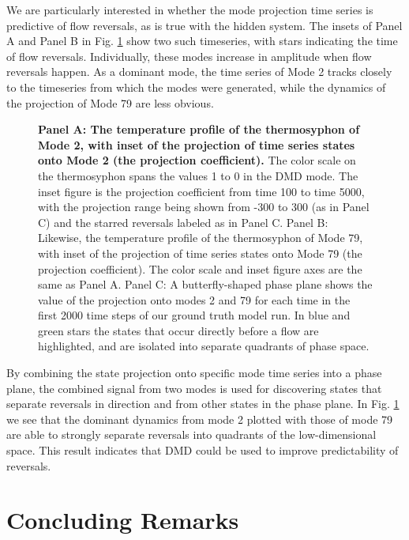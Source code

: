 \documentclass[10pt,letterpaper]{article}
\begin{document}
We are particularly interested in whether the mode projection time series is predictive of flow reversals, as is true with the hidden system.
The insets of Panel A and Panel B in Fig. \ref{fig:DMD_phaseplane} show two such timeseries, with stars indicating the time of flow reversals.
Individually, these modes increase in amplitude when flow reversals happen.
As a dominant mode, the time series of Mode 2 tracks closely to the timeseries from which the modes were generated, while the dynamics of the projection of Mode 79 are less obvious.

\begin{figure}[h]
  \centering
  \caption[]{
\textbf{    Panel A: The temperature profile of the thermosyphon of Mode 2, with inset of the projection of time series states onto Mode 2 (the projection coefficient).
}    The color scale on the thermosyphon spans the values 1 to 0 in the DMD mode.
    The inset figure is the projection coefficient from time 100 to time 5000, with the projection range being shown from -300 to 300 (as in Panel C) and the starred reversals labeled as in Panel C.
    Panel B: Likewise, the temperature profile of the thermosyphon of Mode 79, with inset of the projection of time series states onto Mode 79 (the projection coefficient).
    The color scale and inset figure axes are the same as Panel A.
    Panel C: A butterfly-shaped phase plane shows the value of the projection onto modes 2 and 79 for each time in the first 2000 time steps of our ground truth model run.
    In blue and green stars the states that occur directly before a flow are highlighted, and are isolated into separate quadrants of phase space.
  }
  \label{fig:DMD_phaseplane}
\end{figure}

By combining the state projection onto specific mode time series into a phase plane, the combined signal from two modes is used for discovering states that separate reversals in direction and from other states in the phase plane.
In Fig. \ref{fig:DMD_phaseplane} we see that the dominant dynamics from mode 2 plotted with those of mode 79 are able to strongly separate reversals into quadrants of the low-dimensional space.
This result indicates that DMD could be used to improve predictability of reversals.

\section*{Concluding Remarks}
\end{document}
